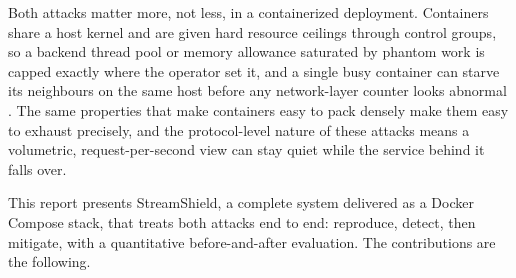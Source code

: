 \documentclass[a4paper,fleqn]{cas-dc}
\begin{document}
Both attacks matter more, not less, in a containerized deployment. Containers share a host kernel and are given hard resource ceilings through control groups, so a backend thread pool or memory allowance saturated by phantom work is capped exactly where the operator set it, and a single busy container can starve its neighbours on the same host before any network-layer counter looks abnormal \cite{dockerDocs}. The same properties that make containers easy to pack densely make them easy to exhaust precisely, and the protocol-level nature of these attacks means a volumetric, request-per-second view can stay quiet while the service behind it falls over.

This report presents StreamShield, a complete system delivered as a Docker Compose stack, that treats both attacks end to end: reproduce, detect, then mitigate, with a quantitative before-and-after evaluation. The contributions are the following.
\end{document}

